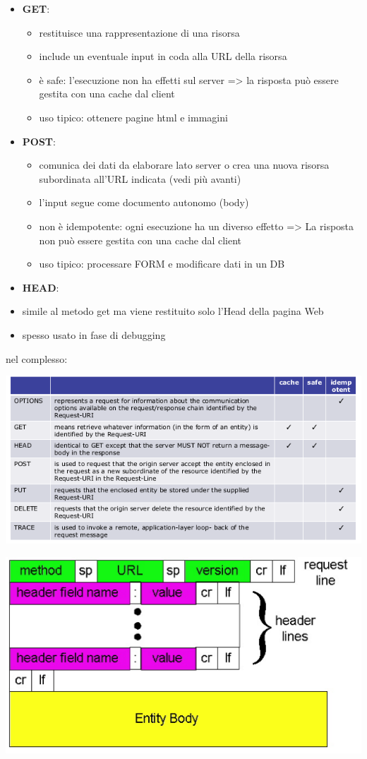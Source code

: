 \documentclass[a4paper,12pt, oneside]{book}
\begin{document}
\begin{itemize}
\item \textbf{GET}:
\begin{itemize}
\item restituisce una rappresentazione di una risorsa
\item include un eventuale input in coda alla URL della risorsa
\item è safe: l'esecuzione non ha effetti sul server
=> la risposta può essere gestita con una cache dal client
\item uso tipico: ottenere pagine html e immagini
\end{itemize}
\item \textbf{POST}:
\begin{itemize}
\item comunica dei dati da elaborare lato server o crea una nuova risorsa
subordinata all’URL indicata (vedi più avanti)
\item l'input segue come documento autonomo (body)
\item non è idempotente: ogni esecuzione ha un diverso effetto
=> La risposta non può essere gestita con una cache dal client
\item uso tipico: processare FORM e modificare dati in un DB
\end{itemize}
\item \textbf{HEAD}:
\item simile al metodo get ma viene restituito solo l’Head della pagina Web
\item spesso usato in fase di debugging
\end{itemize}
nel complesso:
\begin{center}
\includegraphics[scale=0.7]{img/http.png}
\end{center}
\begin{center}
\includegraphics[scale=0.7]{img/http2.png}
\end{center}
\end{document}
